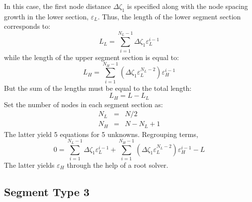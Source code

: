 \documentclass{warpdoc}
\newcommand{\mfd}{\displaystyle}
\begin{document}
In this case, the first node distance $\Delta \zeta_1$ 
is specified along with the node spacing growth in the
lower section, $\varepsilon_L$. Thus, the length of the lower segment section corresponds to:
%
\begin{equation}
L_L=\mfd\sum_{i=1}^{N_L-1} \Delta \zeta_1 \varepsilon_L^{i-1} 
\end{equation}
%
while the length of the upper segment section is equal to:
%
\begin{equation}
L_H=\mfd\sum_{i=1}^{N_H-1} \left( \Delta \zeta_1 \varepsilon_L^{N_L-2}  \right) \varepsilon_H^{i-1} 
\end{equation}
%
But the sum of the lengths must be equal to the total length:
%
\begin{equation}
L_H=L-L_L 
\end{equation}
%
Set the number of nodes in each segment section as:
%
\begin{eqnarray}
   N_L&=&N/2 \\
   N_H&=&N-N_L+1
\end{eqnarray}
%
The latter yield 5 equations for 5 unknowns. Regrouping terms,
%
\begin{equation}
0=\mfd\sum_{i=1}^{N_L-1} \Delta \zeta_1 \varepsilon_L^{i-1}
+\mfd\sum_{i=1}^{N_H-1} \left( \Delta \zeta_1 \varepsilon_L^{N_L-2}  \right) \varepsilon_H^{i-1}
-L
\end{equation}
%
The latter yields $\varepsilon_H$ through the help of a root solver.





\subsection{Segment Type 3}
\end{document}
